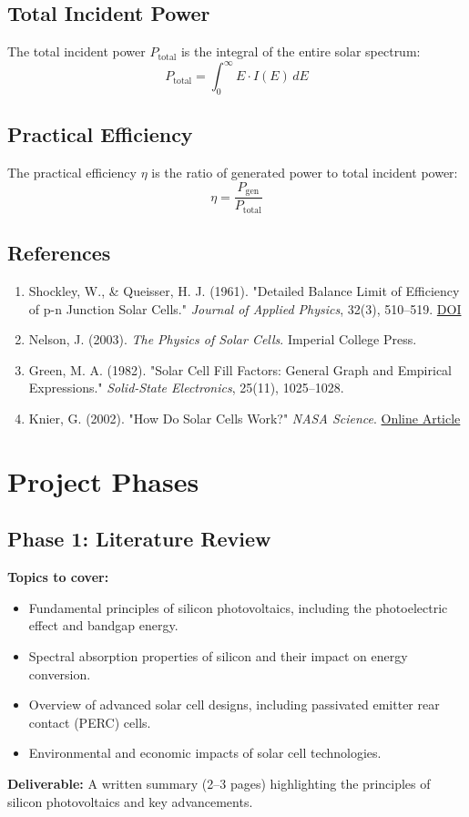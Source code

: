 \documentclass[11pt]{article}
\begin{document}
\subsection{Total Incident Power}
The total incident power $P_{\text{total}}$ is the integral of the entire solar spectrum:
\begin{equation}
P_{\text{total}} = \int_0^\infty E \cdot I(E) \, dE
\end{equation}

\subsection{Practical Efficiency}
The practical efficiency $\eta$ is the ratio of generated power to total incident power:
\begin{equation}
\eta = \frac{P_{\text{gen}}}{P_{\text{total}}}
\end{equation}
\subsection{References}
\begin{enumerate}
    \item Shockley, W., \& Queisser, H. J. (1961). "Detailed Balance Limit of Efficiency of p-n Junction Solar Cells." \textit{Journal of Applied Physics}, 32(3), 510--519. \href{https://doi.org/10.1063/1.1736034}{DOI}
    \item Nelson, J. (2003). \textit{The Physics of Solar Cells}. Imperial College Press.
    \item Green, M. A. (1982). "Solar Cell Fill Factors: General Graph and Empirical Expressions." \textit{Solid-State Electronics}, 25(11), 1025--1028.
    \item Knier, G. (2002). "How Do Solar Cells Work?" \textit{NASA Science}. \href{https://science.nasa.gov/astrophysics/focus-areas/how-do-solar-cells-work}{Online Article}
\end{enumerate}



\section*{Project Phases}

\subsection*{Phase 1: Literature Review}
\textbf{Topics to cover:}
\begin{itemize}
    \item Fundamental principles of silicon photovoltaics, including the photoelectric effect and bandgap energy.
    \item Spectral absorption properties of silicon and their impact on energy conversion.
    \item Overview of advanced solar cell designs, including passivated emitter rear contact (PERC) cells.
    \item Environmental and economic impacts of solar cell technologies.
\end{itemize}
\textbf{Deliverable:} A written summary (2--3 pages) highlighting the principles of silicon photovoltaics and key advancements.
\end{document}
